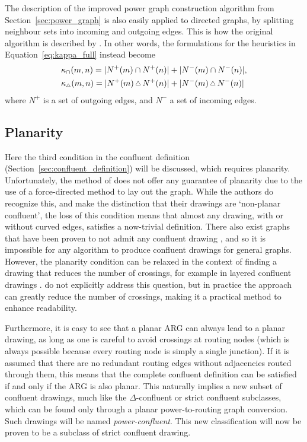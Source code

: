 The description of the improved power graph construction algorithm from Section~\ref{sec:power_graph} is also easily applied to directed graphs, by splitting neighbour sets into incoming and outgoing edges. This is how the original algorithm is described by \citet{Dwyer2014}.
In other words, the formulations for the heuristics in Equation~\eqref{eq:kappa_full} instead become
\begin{align}
  &\kappa_\cap(m,n) = |N^+(m)\cap N^+(n)| + |N^-(m)\cap N^-(n)|,\\
  &\kappa_{\Triangle}(m,n) = |N^+(m)\,\Triangle\,N^+(n)| + |N^-(m)\,\Triangle\,N^-(n)|
\end{align}
where $N^+$ is a set of outgoing edges, and $N^-$ a set of incoming edges.

\subsection{Planarity}
\label{sec:power_planarity}
Here the third condition in the confluent definition (Section~\ref{sec:confluent_definition}) will be discussed, which requires planarity. Unfortunately, the method of \citet{Bach2017} does not offer any guarantee of planarity due to the use of a force-directed method to lay out the graph.
While the authors do recognize this, and make the distinction that their drawings are `non-planar confluent', the loss of this condition means that almost any drawing, with or without curved edges, satisfies a now-trivial definition.
There also exist graphs that have been proven to not admit any confluent drawing \citep{Dickerson2005}, and so it is impossible for any algorithm to produce confluent drawings for general graphs.
However, the planarity condition can be relaxed in the context of finding a drawing that reduces the number of crossings, for example in layered confluent drawings \citep{Eppstein2007}. \citet{Bach2017} do not explicitly address this question, but in practice the approach can greatly reduce the number of crossings, making it a practical method to enhance readability.

Furthermore, it is easy to see that a planar ARG can always lead to a planar drawing, as long as one is careful to avoid crossings at routing nodes (which is always possible because every routing node is simply a single junction). If it is assumed that there are no redundant routing edges without adjacencies routed through them, this means that the complete confluent definition can be satisfied if and only if the ARG is also planar.
This naturally implies a new subset of confluent drawings, much like the $\Delta$-confluent \citep{Eppstein2005} or strict confluent \citep{Eppstein2013} subclasses, which can be found only through a planar power-to-routing graph conversion. Such drawings will be named \emph{power-confluent}.
This new classification will now be proven to be a subclass of strict confluent drawing. 

